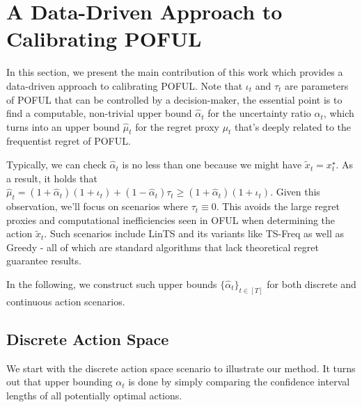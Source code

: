 \section{A Data-Driven Approach to Calibrating POFUL}






In this section, we present the main contribution of this work which provides a data-driven approach to calibrating POFUL. Note that $\iota_t$ and $\tau_t$ are parameters of POFUL that can be controlled by a decision-maker, the essential point is to find a computable, non-trivial upper bound $\hat{\alpha}_t$ for the uncertainty ratio $\alpha_t$, which turns into an upper bound $\hat{\mu}_t$ for the regret proxy $\mu_t$ that's deeply related to the frequentist regret of POFUL. 




Typically, we can check $\hat{\alpha}_t$ is no less than one because we might have $ \tilde{x}_t = x_t^\star$. As a result, it holds that $\hat{\mu}_t  = (1+\hat{\alpha}_t)(1+\iota_t) +  (1-\hat{\alpha}_t) \tau_t \geq  (1+\hat{\alpha}_t)(1+\iota_t) $. Given this observation, we'll focus on scenarios where $\tau_t \equiv 0$.  This avoids the large regret proxies and computational inefficiencies seen in OFUL when determining the action $\tilde{x}_t$. Such scenarios include LinTS and its variants like TS-Freq as well as Greedy - all of which are standard algorithms that lack theoretical regret guarantee results.



In the following, we construct such upper bounds $\{\hat{\alpha}_t\}_{t\in[T]}$ for both discrete and continuous action scenarios. 
 
 
 
 











\subsection{Discrete Action Space}
\label{sec:discrete_actions}




We start with the discrete action space scenario to illustrate our method. It turns out that upper bounding $\alpha_t$ is done by simply comparing the confidence interval lengths of all potentially optimal actions. 





